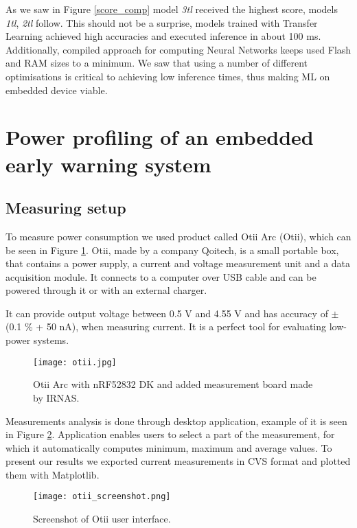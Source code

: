 As we saw in Figure \ref{score_comp} model \textit{3tl} received the highest score, models \textit{1tl}, \textit{2tl} follow.
This should not be a surprise, models trained with Transfer Learning achieved high accuracies and executed inference in about 100 \si{\milli\second}. 
Additionally, compiled approach for computing Neural Networks keeps used Flash and RAM sizes to a minimum.
We saw that using a number of different optimisations is critical to achieving low inference times, thus making ML on embedded device viable.

\section{ Power profiling of an embedded early warning system}

\subsection{ Measuring setup}

To measure power consumption we used product called Otii Arc (Otii), which can be seen in Figure \ref{otii}.
Otii, made by a company Qoitech, is a small portable box, that contains a power supply, a current and voltage measurement unit and a data acquisition module.
It connects to a computer over USB cable and can be powered through it or with an external charger.

It can provide output voltage between 0.5 V and 4.55 V and has accuracy of $\pm$(0.1 \% + 50 nA), when measuring current.
It is a perfect tool for evaluating low-power systems.

\begin{figure}[ht]
    \centering
    \texttt{[image: otii.jpg]}
    \caption{ Otii Arc with nRF52832 DK and added measurement board made by IRNAS.}
    \label{otii}
\end{figure}

Measurements analysis is done through desktop application, example of it is seen in Figure \ref{otii_screen}. 
Application enables users to select a part of the measurement, for which it automatically computes minimum, maximum and average values.
To present our results we exported current measurements in CVS format and plotted them with Matplotlib.

\begin{figure}[ht]
    \centering
    \texttt{[image: otii\_screenshot.png]}
    \caption{ Screenshot of Otii user interface.}
    \label{otii_screen}
\end{figure}

